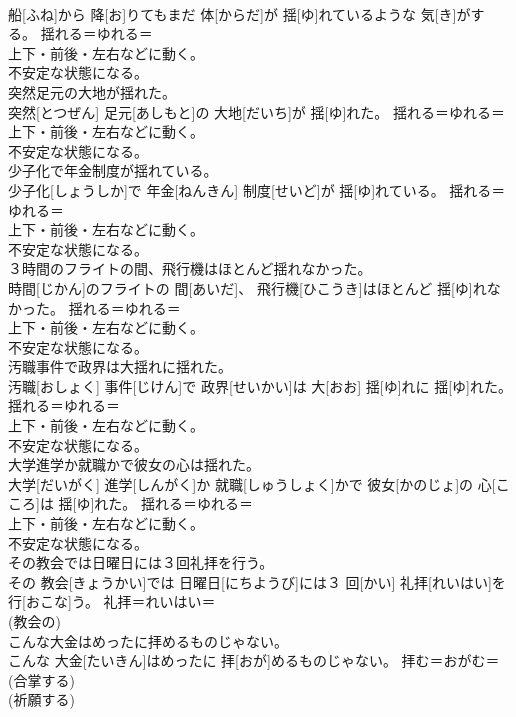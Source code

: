 \documentclass[8pt]{extreport}
\begin{document}
\begin{CJK}{UTF8}{min}
{\\	船[ふね]から 降[お]りてもまだ 体[からだ]が 揺[ゆ]れているような 気[き]がする。	揺れる＝ゆれる＝　
\\	上下・前後・左右などに動く。 
\\	不安定な状態になる。
\\	突然足元の大地が揺れた。	
\\	突然[とつぜん] 足元[あしもと]の 大地[だいち]が 揺[ゆ]れた。	揺れる＝ゆれる＝　
\\	上下・前後・左右などに動く。 
\\	不安定な状態になる。
\\	少子化で年金制度が揺れている。	
\\	少子化[しょうしか]で 年金[ねんきん] 制度[せいど]が 揺[ゆ]れている。	揺れる＝ゆれる＝　
\\	上下・前後・左右などに動く。 
\\	不安定な状態になる。
\\	３時間のフライトの間、飛行機はほとんど揺れなかった。	
\\	時間[じかん]のフライトの 間[あいだ]、 飛行機[ひこうき]はほとんど 揺[ゆ]れなかった。	揺れる＝ゆれる＝　
\\	上下・前後・左右などに動く。 
\\	不安定な状態になる。
\\	汚職事件で政界は大揺れに揺れた。	
\\	汚職[おしょく] 事件[じけん]で 政界[せいかい]は 大[おお] 揺[ゆ]れに 揺[ゆ]れた。	揺れる＝ゆれる＝　
\\	上下・前後・左右などに動く。 
\\	不安定な状態になる。
\\	大学進学か就職かで彼女の心は揺れた。	
\\	大学[だいがく] 進学[しんがく]か 就職[しゅうしょく]かで 彼女[かのじょ]の 心[こころ]は 揺[ゆ]れた。	揺れる＝ゆれる＝　
\\	上下・前後・左右などに動く。 
\\	不安定な状態になる。
\\	その教会では日曜日には３回礼拝を行う。	
\\	その 教会[きょうかい]では 日曜日[にちようび]には３ 回[かい] 礼拝[れいはい]を 行[おこな]う。	礼拝＝れいはい＝ 
\\	(教会の) 
\\	こんな大金はめったに拝めるものじゃない。	
\\	こんな 大金[たいきん]はめったに 拝[おが]めるものじゃない。	拝む＝おがむ＝ (合掌する) 
\\	(祈願する) 
}
\end{CJK}
\end{document}
